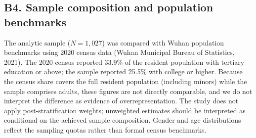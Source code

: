 \subsection*{B4. Sample composition and population benchmarks}

The analytic sample ($N = 1{,}027$) was compared with Wuhan population benchmarks using 2020 census data (Wuhan Municipal Bureau of Statistics, 2021). The 2020 census reported 33.9\% of the resident population with tertiary education or above; the sample reported 25.5\% with college or higher. Because the census share covers the full resident population (including minors) while the sample comprises adults, these figures are not directly comparable, and we do not interpret the difference as evidence of overrepresentation. The study does not apply post-stratification weights; unweighted estimates should be interpreted as conditional on the achieved sample composition. Gender and age distributions reflect the sampling quotas rather than formal census benchmarks.
\clearpage
